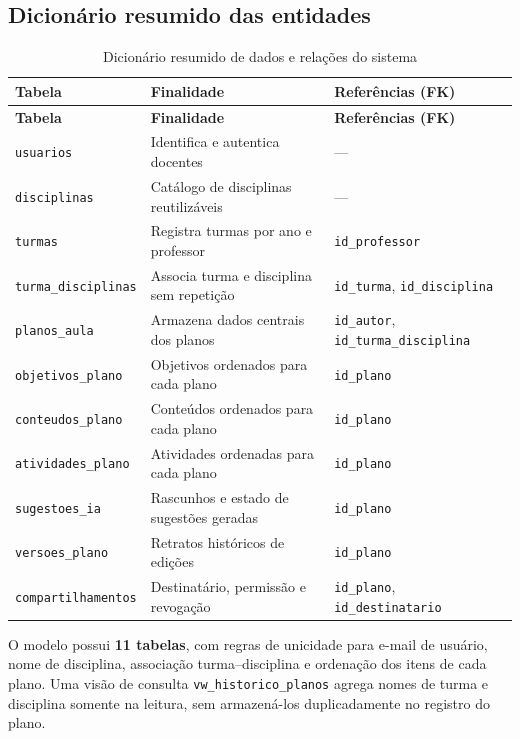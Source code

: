 \documentclass[12pt,a4paper,oneside]{report}
\begin{document}
\subsection{Dicionário resumido das entidades}
\begin{longtable}{@{}p{3.8cm}p{7.0cm}p{4.1cm}@{}}
\caption{Dicionário resumido de dados e relações do sistema}\label{tab:bd-dicionario}\\
\toprule
\textbf{Tabela} & \textbf{Finalidade} & \textbf{Referências (FK)} \\
\midrule\endfirsthead
\toprule \textbf{Tabela} & \textbf{Finalidade} & \textbf{Referências (FK)} \\
\midrule\endhead
\texttt{usuarios} & Identifica e autentica docentes & --- \\
\texttt{disciplinas} & Catálogo de disciplinas reutilizáveis & --- \\
\texttt{turmas} & Registra turmas por ano e professor & \texttt{id\_professor} \\
\texttt{turma\_disciplinas} & Associa turma e disciplina sem repetição & \texttt{id\_turma}, \texttt{id\_disciplina} \\
\texttt{planos\_aula} & Armazena dados centrais dos planos & \texttt{id\_autor}, \texttt{id\_turma\_disciplina} \\
\texttt{objetivos\_plano} & Objetivos ordenados para cada plano & \texttt{id\_plano} \\
\texttt{conteudos\_plano} & Conteúdos ordenados para cada plano & \texttt{id\_plano} \\
\texttt{atividades\_plano} & Atividades ordenadas para cada plano & \texttt{id\_plano} \\
\texttt{sugestoes\_ia} & Rascunhos e estado de sugestões geradas & \texttt{id\_plano} \\
\texttt{versoes\_plano} & Retratos históricos de edições & \texttt{id\_plano} \\
\texttt{compartilhamentos} & Destinatário, permissão e revogação & \texttt{id\_plano}, \texttt{id\_destinatario} \\
\bottomrule
\end{longtable}

O modelo possui \textbf{11 tabelas}, com regras de unicidade para e-mail de usuário, nome de disciplina, associação turma--disciplina e ordenação dos itens de cada plano. Uma visão de consulta \texttt{vw\_historico\_planos} agrega nomes de turma e disciplina somente na leitura, sem armazená-los duplicadamente no registro do plano.
\end{document}
